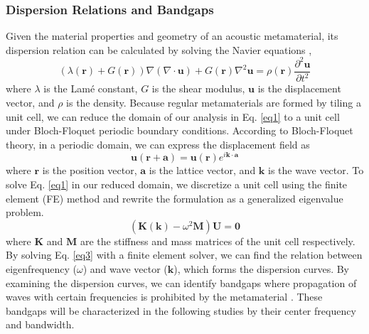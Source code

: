 \documentclass[preprint,review,12pt]{elsarticle}
\begin{document}
\subsubsection{Dispersion Relations and Bandgaps}
\label{subsubsection:Dispersion Relations and Bandgaps}
Given the material properties and geometry of an acoustic metamaterial, its dispersion relation can be calculated by solving the Navier equations \citep[see][]{zhang2021realization},  
\begin{equation}
    (\lambda (\mathbf{r})+ G (\mathbf{r})) \nabla(\nabla \cdot \mathbf{u}) + G (\mathbf{r}) \nabla^2 \mathbf{u} = \rho (\mathbf{r}) \frac{\partial^2 \mathbf{u}}{\partial t^2} \label{eq1}
\end{equation} 
where $\lambda$ is the Lamé constant, $G$ is the shear modulus, $\mathbf{u}$ is the displacement vector, and $\rho$ is the density. 
Because regular metamaterials are formed by tiling a unit cell, we can reduce the domain of our analysis in Eq. \eqref{eq1} to a unit cell under Bloch-Floquet periodic boundary conditions. According to Bloch-Floquet theory, in a periodic domain, we can express the displacement field as \citep{yang2016effective}
\begin{equation}
    \mathbf{u}(\mathbf{r}+\mathbf{a}) = \mathbf{u}(\mathbf{r})e^{i\mathbf{k} \cdot \mathbf{a}}  \label{eq2}
\end{equation}
where $\mathbf{r}$ is the position vector, $\mathbf{a}$ is the lattice vector, and $\mathbf{k}$ is the wave vector. To solve Eq. \eqref{eq1} in our reduced domain, we discretize a unit cell using the finite element (FE) method and rewrite the formulation as a generalized eigenvalue problem.
\begin{equation}
    (\mathbf{K}(\mathbf{k}) - \omega^2 \mathbf{M})\mathbf{U} = \mathbf{0}  \label{eq3}
\end{equation}
where $\mathbf{K}$ and $\mathbf{M}$ are the stiffness and mass matrices of the unit cell respectively. By solving Eq. \eqref{eq3} with a finite element solver, we can find the relation between eigenfrequency ($\omega$) and wave vector ($\mathbf{k}$), which forms the dispersion curves. By examining the dispersion curves, we can identify bandgaps where propagation of waves with certain frequencies is prohibited by the metamaterial \cite{bilal2011ultrawide}. These bandgaps will be characterized in the following studies by their center frequency and bandwidth.

\end{document}
